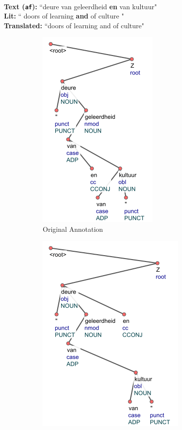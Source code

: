 \begin{example}
\label{examp:projTemp00}
\textbf{ }\\
\textbf{Text (\texttt{af}):} ``deure van geleerdheid \textbf{en} van kultuur"\\
\textbf{Lit:} `` doors of learning \textbf{and} of culture " \\
\textbf{Translated:} ``doors of learning and of culture"
\end{example}

\begin{figure}[H]
    \begin{subfigure}{.45\textwidth}
    \includegraphics[scale=0.80]{img/projTempFix00-orig.png}
    \caption{Original Annotation}
    \label{projTempFix00-orig}  
    \end{subfigure}
    \begin{subfigure}{.5\textwidth}
    \includegraphics[scale=0.80]{img/projTempFix00-mod.png}

\end{subfigure}
\end{figure}
